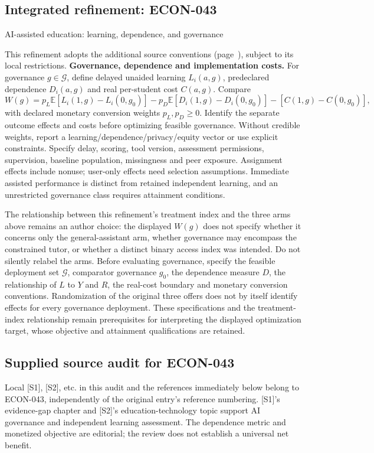 \documentclass[11pt,a4paper]{article}
\begin{document}
\subsection*{Integrated refinement: ECON-043}
{\sffamily\small\color{muted}AI-assisted education: learning, dependence, and governance\par}
This refinement adopts the additional source conventions
(page~\pageref{audited:conventions}), subject to its local restrictions.
\textbf{Governance, dependence and implementation costs.}
For governance $g\in\mathcal G$, define delayed unaided learning $L_i(a,g)$,
predeclared dependence $D_i(a,g)$ and real per-student cost $C(a,g)$. Compare
\[
W(g)=p_L\mathbb E[L_i(1,g)-L_i(0,g_0)]
     -p_D\mathbb E[D_i(1,g)-D_i(0,g_0)]
     -[C(1,g)-C(0,g_0)],
\]
with declared monetary conversion weights $p_L,p_D\geq0$. Identify the separate
outcome effects and costs before optimizing feasible governance. Without
credible weights, report a learning/dependence/privacy/equity vector or use
explicit constraints. Specify delay, scoring, tool version, assessment
permissions, supervision, baseline population, missingness and peer exposure.
Assignment effects include nonuse; user-only effects need selection assumptions.
Immediate assisted performance is distinct from retained independent learning,
and an unrestricted governance class requires attainment conditions.

The relationship between this refinement's treatment index and the three arms above remains an author choice: the displayed $W(g)$ does not specify whether it concerns only the general-assistant arm, whether governance may encompass the constrained tutor, or whether a distinct binary access index was intended. Do not silently relabel the arms. Before evaluating governance, specify the feasible deployment set $\mathcal G$, comparator governance $g_0$, the dependence measure $D$, the relationship of $L$ to $Y$ and $R$, the real-cost boundary and monetary conversion conventions. Randomization of the original three offers does not by itself identify effects for every governance deployment. These specifications and the treatment-index relationship remain prerequisites for interpreting the displayed optimization target, whose objective and attainment qualifications are retained.
\subsection*{Supplied source audit for ECON-043}
Local [S1], [S2], etc. in this audit and the references immediately below
belong to ECON-043, independently of the original entry's reference numbering.
[S1]'s evidence-gap chapter and [S2]'s education-technology topic support AI governance and independent learning assessment. The dependence metric and monetized objective are editorial; the review does not establish a universal net benefit.
\end{document}
